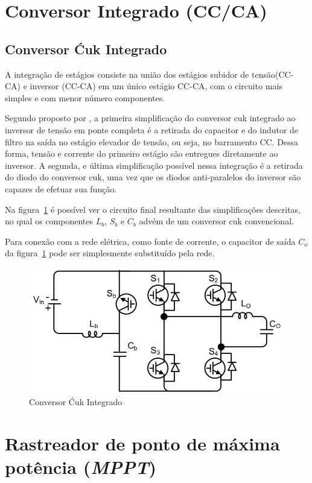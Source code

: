 \documentclass[
	12pt,				%
	openright,			%
	onseside,
	a4paper,			%
	english,			%
	french,				%
	spanish,			%
	brazil,				%
	]{abntex2}
\begin{document}
\section{Conversor Integrado (CC/CA)}
\subsection{Conversor Ćuk Integrado}

A integração de estágios consiste na união dos estágios subidor de tensão(CC-CA) e inversor (CC-CA) em um único estágio CC-CA, com o circuito mais simples e com menor número componentes. 

Segundo proposto por , a primeira simplificação do conversor cuk integrado ao inversor de tensão em ponte completa é a retirada do capacitor e do indutor de filtro na saída no estágio elevador de tensão, ou seja, no barramento CC. Dessa forma, tensão e corrente do primeiro estágio são entregues diretamente ao inversor. A segunda, e última simplificação possível nessa integração é a retirada do diodo do conversor cuk, uma vez que os diodos anti-paralelos do inversor são capazes de efetuar sua função.

Na figura~\ref{fig:integ_cuk_circ} é possível ver o circuito final resultante das simplificações descritas, no qual os componentes $L_b$, $S_b$ e $C_b$ advém de um conversor cuk convencional. 

Para conexão com a rede elétrica, como fonte de corrente, o capacitor de saída $C_o$ da figura~\ref{fig:integ_cuk_circ} pode ser simplesmente substituído pela rede\cite{LUIGI_int_top}. 

\begin{figure}[htbp]
	\begin{center}
		\includegraphics[width=0.55 \linewidth]{integ_cuk_circ}
		\caption{Conversor Ćuk Integrado \cite{LUIGI_int_top}}
		\label{fig:integ_cuk_circ}
	\end{center}
\end{figure}

\section{Rastreador de ponto de máxima potência (\textit{MPPT})}
\end{document}
